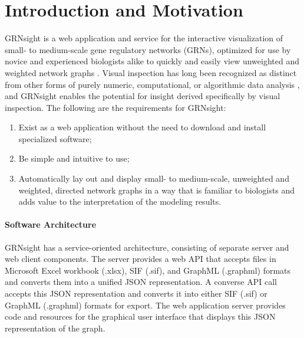 \documentclass[sigconf,review]{acmart}
\begin{document}
\section{Introduction and Motivation}

GRNsight is a web application and service for the interactive visualization of small- to medium-scale gene regulatory networks (GRNs), optimized for use by novice and experienced biologists alike to quickly and easily view unweighted and weighted network graphs \cite{peerj}. Visual inspection has long been recognized as distinct from other forms of purely numeric, computational, or algorithmic data analysis \cite{Tufte:1986:VDQ:33404, card1999readings}, and GRNsight enables the potential for insight derived specifically by visual inspection. The following are the requirements for GRNsight:

\begin{enumerate}
\item Exist as a web application without the need to download and install specialized software;
\item Be simple and intuitive to use;
\item Automatically lay out and display small- to medium-scale, unweighted and weighted, directed network graphs in a way that is familiar to biologists and adds value to the interpretation of the modeling results.
\end{enumerate} 

\paragraph{Software Architecture} GRNsight has a service-oriented architecture, consisting of separate server and web client components. The server provides a web API that accepts files in Microsoft Excel workbook (.xlsx), SIF (.sif), and GraphML (.graphml) formats and converts them into a unified JSON representation. A converse API call accepts this JSON representation and converts it into either SIF (.sif) or GraphML (.graphml) formats for export. The web application server provides code and resources for the graphical user interface that displays this JSON representation of the graph.
\end{document}

